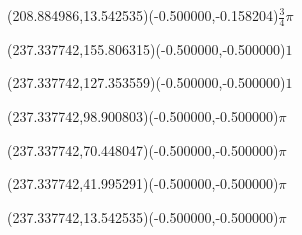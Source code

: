 \documentclass[12pt]{article}
\begin{document}
%
%
\fontsize{12.000000}{14.400000}\selectfont%
\ASYalign(208.884986,13.542535)(-0.500000,-0.158204){$\displaystyle \frac{3}{4}\pi$}%
%
%
\fontsize{12.000000}{14.400000}\selectfont%
\ASYalign(237.337742,155.806315)(-0.500000,-0.500000){$1$}%
%
%
\fontsize{12.000000}{14.400000}\selectfont%
\ASYalign(237.337742,127.353559)(-0.500000,-0.500000){$1$}%
%
%
\fontsize{12.000000}{14.400000}\selectfont%
\ASYalign(237.337742,98.900803)(-0.500000,-0.500000){$\pi$}%
%
%
\fontsize{12.000000}{14.400000}\selectfont%
\ASYalign(237.337742,70.448047)(-0.500000,-0.500000){$\pi$}%
%
%
\fontsize{12.000000}{14.400000}\selectfont%
\ASYalign(237.337742,41.995291)(-0.500000,-0.500000){$\pi$}%
%
%
\fontsize{12.000000}{14.400000}\selectfont%
\ASYalign(237.337742,13.542535)(-0.500000,-0.500000){$\pi$}%
\end{document}
